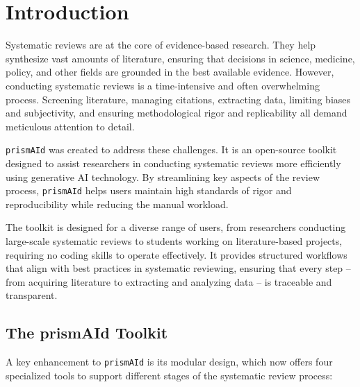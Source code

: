 \chapter{Introduction} \label{chap:intro}

Systematic reviews are at the core of evidence-based research. They help synthesize vast amounts of literature, ensuring that decisions in science, medicine, policy, and other fields are grounded in the best available evidence. However, conducting systematic reviews is a time-intensive and often overwhelming process. Screening literature, managing citations, extracting data, limiting biases and subjectivity, and ensuring methodological rigor and replicability all demand meticulous attention to detail.

\texttt{prismAId} was created to address these challenges. It is an open-source toolkit designed to assist researchers in conducting systematic reviews more efficiently using generative AI technology. By streamlining key aspects of the review process, \texttt{prismAId} helps users maintain high standards of rigor and reproducibility while reducing the manual workload.

The toolkit is designed for a diverse range of users, from researchers conducting large-scale systematic reviews to students working on literature-based projects, requiring no coding skills to operate effectively. It provides structured workflows that align with best practices in systematic reviewing, ensuring that every step -- from acquiring literature to extracting and analyzing data -- is traceable and transparent.

\bigskip

\section{The prismAId Toolkit}

A key enhancement to \texttt{prismAId} is its modular design, which now offers four specialized tools to support different stages of the systematic review process:


